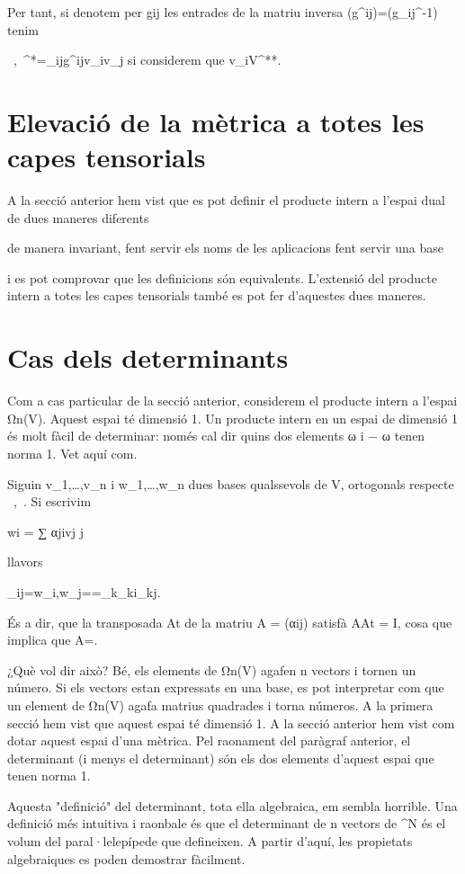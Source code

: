 Per tant, si denotem per gij les entrades de la matriu inversa (g^{ij})=(g_{ij}^{-1}) tenim

    \left\langle\ ,\ \right\rangle^*=\sum_{ij}g^{ij}v_i\otimes v_j si considerem que v_i\in V^{**}. 

\section{Elevació de la mètrica a totes les capes tensorials}

A la secció anterior hem vist que es pot definir el producte intern a l'espai dual de dues maneres diferents

    de manera invariant, fent servir els noms de les aplicacions
    fent servir una base 

i es pot comprovar que les definicions són equivalents. L'extensió del producte intern a totes les capes tensorials també es pot fer d'aquestes dues maneres.

\section{Cas dels determinants}

Com a cas particular de la secció anterior, considerem el producte intern a l'espai Ωn(V). Aquest espai té dimensió 1. Un producte intern en un espai de dimensió 1 és molt fàcil de determinar: només cal dir quins dos elements ω i − ω tenen norma 1. Vet aquí com.

Siguin v_1,\dots,v_n i w_1,\dots,w_n dues bases qualssevols de V, ortogonals respecte \left\langle\ ,\ \right\rangle. Si escrivim

wi = 	∑	αjivj
	j	

llavors

    \delta_{ij}=\left\langle w_i,w_j\right\rangle =\cdots=\sum_k\alpha_{ki}\alpha_{kj}. 

És a dir, que la transposada At de la matriu A = (αij) satisfà AAt = I, cosa que implica que \det A=.

¿Què vol dir això? Bé, els elements de Ωn(V) agafen n vectors i tornen un número. Si els vectors estan expressats en una base, es pot interpretar com que un element de Ωn(V) agafa matrius quadrades i torna números. A la primera secció hem vist que aquest espai té dimensió 1. A la secció anterior hem vist com dotar aquest espai d'una mètrica. Pel raonament del paràgraf anterior, el determinant (i menys el determinant) són els dos elements d'aquest espai que tenen norma 1.


Aquesta "definició" del determinant, tota ella algebraica, em sembla horrible. Una definició més intuitiva i raonbale és que el determinant de n vectors de ^N és el volum del paral·lelepípede que defineixen. A partir d'aquí, les propietats algebraiques es poden demostrar fàcilment.







